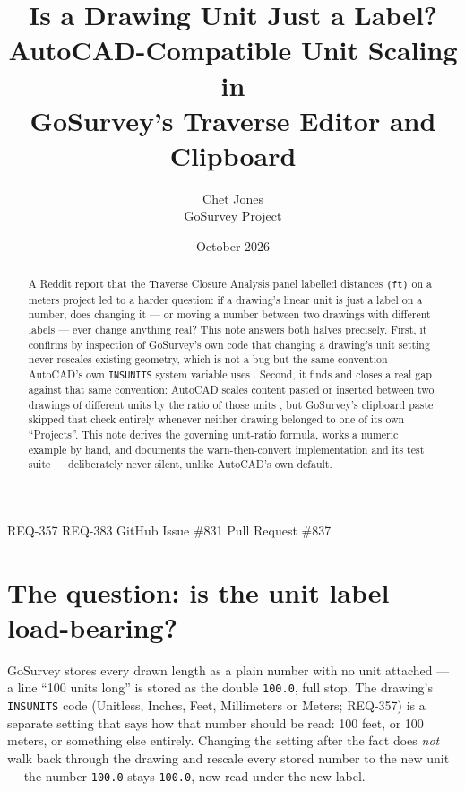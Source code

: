 \documentclass[11pt]{article}
\title{\textbf{Is a Drawing Unit Just a Label?\\AutoCAD-Compatible Unit Scaling in\\GoSurvey's Traverse Editor and Clipboard}}
\author{Chet Jones \\ \small GoSurvey Project}
\date{October 2026}
\begin{document}
\maketitle
\vspace{-1.5em}
\begin{center}
\small REQ-357 \quad\textbar\quad REQ-383 \quad\textbar\quad GitHub Issue \#831 \quad\textbar\quad Pull Request \#837
\end{center}
\vspace{1em}

\begin{abstract}
\noindent A Reddit report that the Traverse Closure Analysis panel labelled
distances \texttt{(ft)} on a meters project led to a harder question: if a
drawing's linear unit is just a label on a number, does changing it --- or
moving a number between two drawings with different labels --- ever change
anything real? This note answers both halves precisely. First, it confirms
by inspection of GoSurvey's own code that changing a drawing's unit setting
never rescales existing geometry, which is not a bug but the same
convention AutoCAD's own \texttt{INSUNITS} system variable uses
\citep{autodeskInsunits}. Second, it finds and closes a real gap against
that same convention: AutoCAD scales content pasted or inserted between two
drawings of different units by the ratio of those units
\citep{autodeskInsunits}, but GoSurvey's clipboard paste skipped that check
entirely whenever neither drawing belonged to one of its own ``Projects''.
This note derives the governing unit-ratio formula, works a numeric example
by hand, and documents the warn-then-convert implementation and its test
suite --- deliberately never silent, unlike AutoCAD's own default.
\end{abstract}

\section{The question: is the unit label load-bearing?}
\label{sec:question}

GoSurvey stores every drawn length as a plain number with no unit attached
--- a line ``100 units long'' is stored as the double \texttt{100.0}, full
stop. The drawing's \texttt{INSUNITS} code (Unitless, Inches, Feet,
Millimeters or Meters; REQ-357) is a separate setting that says how that
number should be read: 100 feet, or 100 meters, or something else entirely.
Changing the setting after the fact does \emph{not} walk back through the
drawing and rescale every stored number to the new unit --- the number
\texttt{100.0} stays \texttt{100.0}, now read under the new label.
\end{document}
